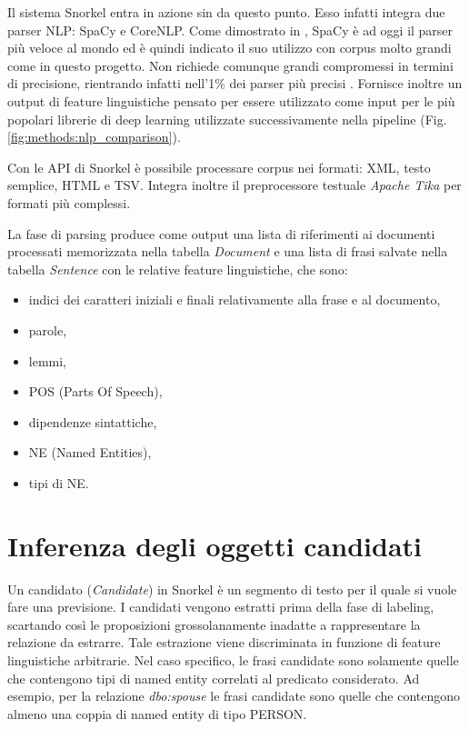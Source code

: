 Il sistema Snorkel entra in azione sin da questo punto. Esso infatti integra due parser NLP: SpaCy e CoreNLP. Come dimostrato in \cite{Choi2015ItDD}, SpaCy è ad oggi il parser più veloce al mondo ed è quindi indicato il suo utilizzo con corpus molto grandi come in questo progetto. Non richiede comunque grandi compromessi in termini di precisione, rientrando infatti nell'1\% dei parser più precisi \cite{Spacyfacts}. Fornisce inoltre un output di feature linguistiche pensato per essere utilizzato come input per le più popolari librerie di deep learning utilizzate successivamente nella pipeline (Fig. \ref{fig:methods:nlp_comparison}).

Con le API di Snorkel è possibile processare corpus nei formati: XML, testo semplice, HTML e TSV. Integra inoltre il preprocessore testuale \textit{Apache Tika} per formati più complessi.

La fase di parsing produce come output una lista di riferimenti ai documenti processati memorizzata nella tabella \textit{Document} e una lista di frasi salvate nella tabella \textit{Sentence} con le relative feature linguistiche, che sono:
\begin{itemize}
\item indici dei caratteri iniziali e finali relativamente alla frase e al documento,
\item parole,
\item lemmi,
\item POS (Parts Of Speech),
\item dipendenze sintattiche,
\item NE (Named Entities),
\item tipi di NE.
\end{itemize}






















\section{Inferenza degli oggetti candidati}
\label{sec:methods:candidate_inference}
Un candidato (\textit{Candidate}) in Snorkel è un segmento di testo per il quale si vuole fare una previsione. I candidati vengono estratti prima della fase di labeling, scartando così le proposizioni grossolanamente inadatte a rappresentare la relazione da estrarre. Tale estrazione viene discriminata in funzione di feature linguistiche arbitrarie. Nel caso specifico, le frasi candidate sono solamente quelle che contengono tipi di named entity correlati al predicato considerato. Ad esempio, per la relazione \textit{dbo:spouse} le frasi candidate sono quelle che contengono almeno una coppia di named entity di tipo PERSON.

